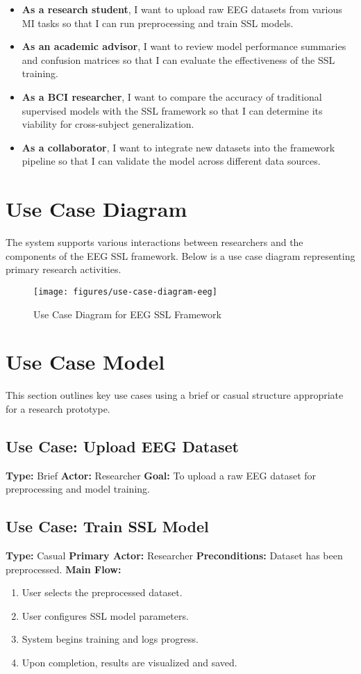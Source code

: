 \begin{itemize}
    \item \textbf{As a research student}, I want to upload raw EEG datasets from various MI tasks so that I can run preprocessing and train SSL models.
    \item \textbf{As an academic advisor}, I want to review model performance summaries and confusion matrices so that I can evaluate the effectiveness of the SSL training.
    \item \textbf{As a BCI researcher}, I want to compare the accuracy of traditional supervised models with the SSL framework so that I can determine its viability for cross-subject generalization.
    \item \textbf{As a collaborator}, I want to integrate new datasets into the framework pipeline so that I can validate the model across different data sources.
\end{itemize}


\section{Use Case Diagram}
\label{sec:use-case-diagram}
The system supports various interactions between researchers and the components of the EEG SSL framework. Below is a use case diagram representing primary research activities.


\begin{figure}[H]
    \centering
    \texttt{[image: figures/use-case-diagram-eeg]}
    \caption{Use Case Diagram for EEG SSL Framework}\label{fig:figure}
\end{figure}

\section{Use Case Model}
\label{sec:use-case-model}

This section outlines key use cases using a brief or casual structure appropriate for a research prototype.

\subsection*{Use Case: Upload EEG Dataset}
\textbf{Type:} Brief
\textbf{Actor:} Researcher
\textbf{Goal:} To upload a raw EEG dataset for preprocessing and model training.

\subsection*{Use Case: Train SSL Model}
\textbf{Type:} Casual
\textbf{Primary Actor:} Researcher
\textbf{Preconditions:} Dataset has been preprocessed.
\textbf{Main Flow:}
\begin{enumerate}
    \item User selects the preprocessed dataset.
    \item User configures SSL model parameters.
    \item System begins training and logs progress.
    \item Upon completion, results are visualized and saved.
\end{enumerate}

